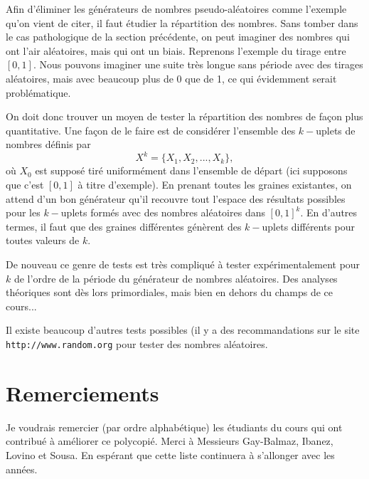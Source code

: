 \documentclass[a4paper,12pt]{book}
\begin{document}
Afin d'éliminer les générateurs de nombres pseudo-aléatoires comme l'exemple qu'on 
vient de citer, il faut étudier la répartition des nombres. Sans tomber dans le cas pathologique de la section
précédente, on peut imaginer des nombres qui ont l'air aléatoires, mais qui ont un biais. 
Reprenons l'exemple du tirage entre $[0,1]$. Nous pouvons imaginer une suite très longue 
sans période avec des tirages aléatoires, mais avec beaucoup plus de 0 que de 1, ce qui évidemment serait problématique.

On doit donc trouver un moyen de tester la répartition des nombres de façon plus quantitative.
Une façon de le faire est de considérer l'ensemble des $k-$uplets de nombres définis par
\begin{equation}
 X^k=\{X_1,X_2, ..., X_k\},
\end{equation}
où $X_0$ est supposé tiré uniformément dans l'ensemble de départ (ici supposons que c'est $[0,1]$ à titre d'exemple).
En prenant toutes les graines existantes, on attend d'un bon générateur qu'il recouvre tout l'espace des résultats possibles
pour les $k-$uplets formés avec des nombres aléatoires dans $[0,1]^k$. En d'autres termes, il faut que des graines différentes
génèrent des $k-$uplets différents pour toutes valeurs de $k$. 

De nouveau ce genre de tests est très compliqué à tester expérimentalement pour $k$ de l'ordre de la période 
du générateur de nombres aléatoires. Des analyses théoriques sont dès lors primordiales, mais bien en dehors 
du champs de ce cours...

Il existe beaucoup d'autres tests possibles (il y a des recommandations sur le site \texttt{http://www.random.org} 
pour tester des nombres aléatoires. 

\chapter{Remerciements}

Je voudrais remercier (par ordre alphabétique) les étudiants du cours qui ont contribué à améliorer ce polycopié. Merci à Messieurs Gay-Balmaz, Ibanez, Lovino et Sousa. 
En espérant que cette liste continuera 
à s'allonger avec les années.
\end{document}

